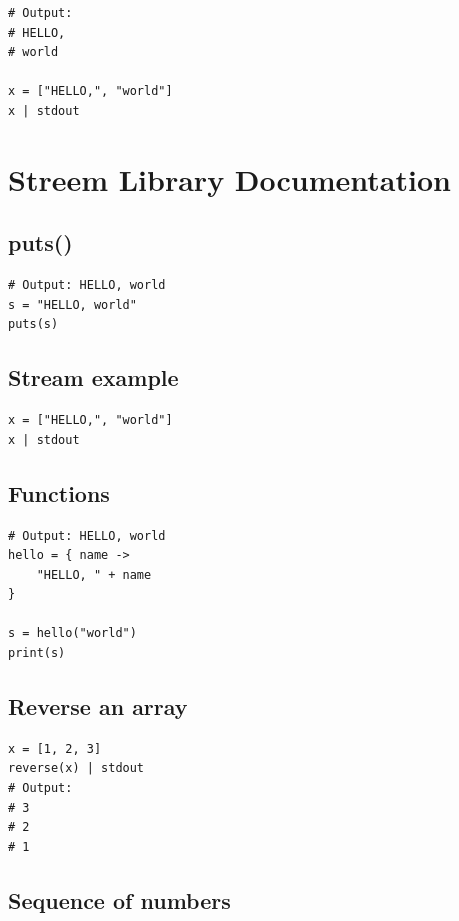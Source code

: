 \documentclass[12pt,a4paper]{article}
\begin{document}
\begin{lstlisting}[style=streem]
# Output:
# HELLO,
# world

x = ["HELLO,", "world"]
x | stdout
\end{lstlisting}

\section{Streem Library Documentation}

\subsection{puts()}

\begin{lstlisting}[style=streem]
# Output: HELLO, world
s = "HELLO, world"
puts(s)
\end{lstlisting}

\subsection{Stream example}

\begin{lstlisting}[style=streem]
x = ["HELLO,", "world"]
x | stdout
\end{lstlisting}

\subsection{Functions}

\begin{lstlisting}[style=streem]
# Output: HELLO, world
hello = { name ->
    "HELLO, " + name
}

s = hello("world")
print(s)
\end{lstlisting}

\subsection{Reverse an array}

\begin{lstlisting}[style=streem]
x = [1, 2, 3]
reverse(x) | stdout
# Output:
# 3
# 2
# 1
\end{lstlisting}

\subsection{Sequence of numbers}
\end{document}

